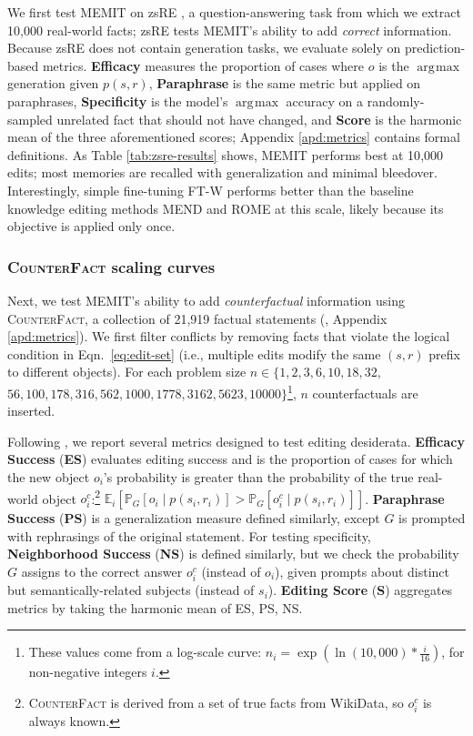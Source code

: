 \documentclass{article} %
\newcommand{\cfd}{\textsc{CounterFact}\xspace}
\newcommand{\method}{MEMIT\xspace}
\DeclareMathOperator*{\argmax}{\arg\!\max}
\newcommand{\exsub}[2]{\mathbb{E}_{#2}\left[ #1 \right]}
\newcommand{\prsub}[2]{\mathbb{P}_{#2}\left[ #1 \right]}
\newcommand{\refeqn}[1]{Eqn.~\ref{eq:#1}}
\newcommand{\iclrnew}[1]{#1}
\begin{document}
We first test \method on zsRE \citep{levy2017zero}, a question-answering task from which we extract 10{,}000 real-world facts; zsRE tests \method's ability to add \textit{correct} information. Because zsRE does not contain generation tasks, we evaluate solely on prediction-based metrics. \textbf{Efficacy} measures the proportion of cases where $o$ is the $\argmax$ generation given $p(s, r)$, \textbf{Paraphrase} is the same metric but applied on paraphrases, \textbf{Specificity} is the model's $\argmax$ accuracy on a randomly-sampled unrelated fact that should not have changed, and \textbf{Score} is the harmonic mean of the three aforementioned scores; \iclrnew{Appendix \ref{apd:metrics} contains formal definitions.}
As Table \ref{tab:zsre-results} shows, \method performs best at 10{,}000 edits; most memories are recalled with generalization and minimal bleedover.
Interestingly, simple fine-tuning FT-W performs better than the baseline knowledge editing methods MEND and ROME at this scale, likely because its objective is applied only once.

\subsubsection{\cfd scaling curves} \label{subsubsec:cf-scaling}

Next, we test \method's ability to add \textit{counterfactual} information using \cfd, a collection of 21,919 factual statements (\citet{meng2022locating}, Appendix \ref{apd:metrics}). We first filter conflicts by removing facts that violate the logical condition in \refeqn{edit-set} (i.e., multiple edits modify the same $(s, r)$ prefix to different objects).
For each problem size $n\in \{1, 2, 3, 6, 10, 18, 32,$ $56, 100, 178, 316, 562, 1000, 1778, 3162, 5623, 10000\}$\footnote{These values come from a log-scale curve: $n_i = \exp\left( \ln(10{,}000) * \frac{i}{16} \right)$, for non-negative integers $i$.}, $n$ counterfactuals are inserted.

Following \citet{meng2022locating}, we report several metrics designed to test editing desiderata.
\textbf{Efficacy Success} (\textbf{ES}) evaluates editing success and is the proportion of cases for which the new object $o_i$'s probability is greater than the probability of the true real-world object $o_i^c$:\footnote{\cfd is derived from a set of true facts from WikiData, so $o_i^c$ is always known.} $\exsub{\prsub{o_i \mid p(s_i, r_i)}{G} > \prsub{o_i^c \mid p(s_i, r_i)}{G}}{i}$.
\textbf{Paraphrase Success} (\textbf{PS}) is a generalization measure  
defined similarly, except $G$ is prompted with rephrasings of the original statement. 
For testing specificity, %
\textbf{Neighborhood Success} (\textbf{NS}) is defined similarly, but we check the probability $G$ assigns to the correct answer $o_i^c$ (instead of $o_i$), given prompts about distinct but semantically-related subjects (instead of $s_i$).
\textbf{Editing Score} (\textbf{S}) aggregates metrics by taking the harmonic mean of ES, PS, NS.
\end{document}
